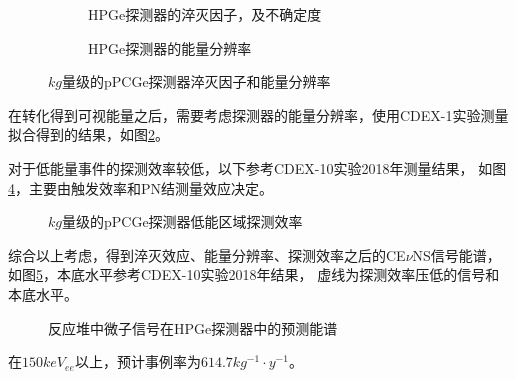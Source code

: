 \begin{figure}
  \begin{subfigure}{.5\textwidth}
    \centering
    
    \caption{\label{fig:ge_quenching_factor} HPGe探测器的淬灭因子，及不确定度\cite{zhao_search_2016}}
  \end{subfigure}
  \begin{subfigure}{.5\textwidth}
    \centering
    
    \caption{\label{fig:ge_resolution} HPGe探测器的能量分辨率}
  \end{subfigure}
  \caption{\label{fig:ge_qf_reso} $\si{kg}$量级的pPCGe探测器淬灭因子和能量分辨率}
\end{figure}

在转化得到可视能量之后，需要考虑探测器的能量分辨率，使用CDEX-1实验测量拟合得到的结果，如图\ref{fig:ge_resolution}。

对于低能量事件的探测效率较低，以下参考CDEX-10实验2018年测量结果\cite{jiang_limits_2018}，
如图\ref{fig:ge_efficiency}，主要由触发效率和PN结测量效应决定。

\begin{figure}
  \centering
  
  \caption{\label{fig:ge_efficiency} $\si{kg}$量级的pPCGe探测器低能区域探测效率\cite{jiang_limits_2018}}
\end{figure}

综合以上考虑，得到淬灭效应、能量分辨率、探测效率之后的CE$\nu$NS信号能谱，
如图\ref{fig:event_smear_Ge_rate_prediction}，本底水平参考CDEX-10实验2018年结果\cite{jiang_limits_2018}，
虚线为探测效率压低的信号和本底水平。

\begin{figure}
  \centering
  
  \caption{\label{fig:event_smear_Ge_rate_prediction} 
  反应堆中微子信号在HPGe探测器中的预测能谱}
\end{figure}

在$150\si{keV_{ee}}$以上，预计事例率为$614.7\si{kg^{-1}\cdot y^{-1}}$。
